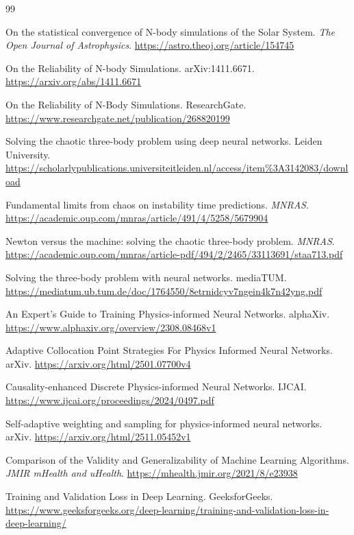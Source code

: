 \documentclass[11pt, a4paper]{article}
\begin{document}
\begin{thebibliography}{99}

 On the statistical convergence of N-body simulations of the Solar System. \textit{The Open Journal of Astrophysics}. \url{https://astro.theoj.org/article/154745}

 On the Reliability of N-body Simulations. arXiv:1411.6671. \url{https://arxiv.org/abs/1411.6671}

 On the Reliability of N-Body Simulations. ResearchGate. \url{https://www.researchgate.net/publication/268820199}

 Solving the chaotic three-body problem using deep neural networks. Leiden University. \url{https://scholarlypublications.universiteitleiden.nl/access/item%3A3142083/download}

 Fundamental limits from chaos on instability time predictions. \textit{MNRAS}. \url{https://academic.oup.com/mnras/article/491/4/5258/5679904}

 Newton versus the machine: solving the chaotic three-body problem. \textit{MNRAS}. \url{https://academic.oup.com/mnras/article-pdf/494/2/2465/33113691/staa713.pdf}

 Solving the three-body problem with neural networks. mediaTUM. \url{https://mediatum.ub.tum.de/doc/1764550/8etrnidcyv7ngein4k7n42yng.pdf}

 An Expert's Guide to Training Physics-informed Neural Networks. alphaXiv. \url{https://www.alphaxiv.org/overview/2308.08468v1}

 Adaptive Collocation Point Strategies For Physics Informed Neural Networks. arXiv. \url{https://arxiv.org/html/2501.07700v4}

 Causality-enhanced Discrete Physics-informed Neural Networks. IJCAI. \url{https://www.ijcai.org/proceedings/2024/0497.pdf}

 Self-adaptive weighting and sampling for physics-informed neural networks. arXiv. \url{https://arxiv.org/html/2511.05452v1}

 Comparison of the Validity and Generalizability of Machine Learning Algorithms. \textit{JMIR mHealth and uHealth}. \url{https://mhealth.jmir.org/2021/8/e23938}

 Training and Validation Loss in Deep Learning. GeeksforGeeks. \url{https://www.geeksforgeeks.org/deep-learning/training-and-validation-loss-in-deep-learning/}


\end{thebibliography}
\end{document}

